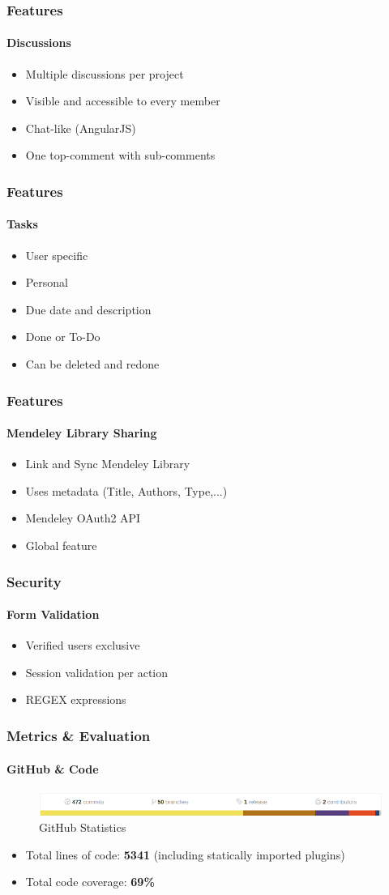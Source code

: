\documentclass{beamer}
\begin{document}
\begin{frame}
\frametitle{Features}
\framesubtitle{Discussions}
	\begin{itemize}
		\item Multiple discussions per project
		\item Visible and accessible to every member
		\item Chat-like (AngularJS)
		\item One top-comment with sub-comments
	\end{itemize}
\end{frame}

\begin{frame}
\frametitle{Features}
\framesubtitle{Tasks}
	\begin{itemize}
		\item User specific
		\item Personal
		\item Due date and description
		\item Done or To-Do
		\item Can be deleted and redone
	\end{itemize}
\end{frame}

\begin{frame}
\frametitle{Features}
\framesubtitle{Mendeley Library Sharing}
	\begin{itemize}
		\item Link and Sync Mendeley Library
		\item Uses metadata (Title, Authors, Type,...)
		\item Mendeley OAuth2 API
		\item Global feature
	\end{itemize}
\end{frame}

\begin{frame}
\frametitle{Security}
\framesubtitle{Form Validation}
	\begin{itemize}
		\item Verified users exclusive
		\item Session validation per action
		\item REGEX expressions
	\end{itemize}
\end{frame}

\begin{frame}
\frametitle{Metrics \& Evaluation}
\framesubtitle{GitHub \& Code}
	\begin{figure}
		\includegraphics[scale=0.3]{./images/github_stats.png}
		\caption{GitHub Statistics}
	\end{figure}
	\begin{itemize}
		\item Total lines of code: \textbf{5341} (including statically imported plugins)
		\item Total code coverage: \textbf{69\%}
	\end{itemize}
\end{frame}
\end{document}
